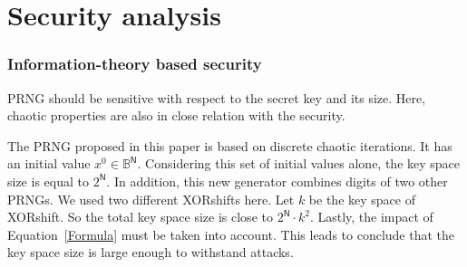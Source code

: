 \chapter{Security analysis}
\label{Security analysis}
\minitoc


\subsection{Information-theory based security}

PRNG should be sensitive with respect to the secret key and its size. Here, chaotic properties are also in close relation with the security. 


The PRNG proposed in this paper is based on discrete chaotic iterations. It has an initial 
value $x^0\in \mathds{B}^{\mathsf{N}}$. Considering this set of initial values alone, the key space size 
is equal to $2^\mathsf{N}$. In addition, this new generator combines digits of two other PRNGs. We used two different XORshifts here. Let $k$ be the key space of XORshift. So the total key space 
size is close to $2^\mathsf{N}\cdot k^2$. Lastly, the impact of Equation~\ref{Formula} must be 
taken into account.
This leads to conclude that the key space size is large enough to withstand 
attacks.



